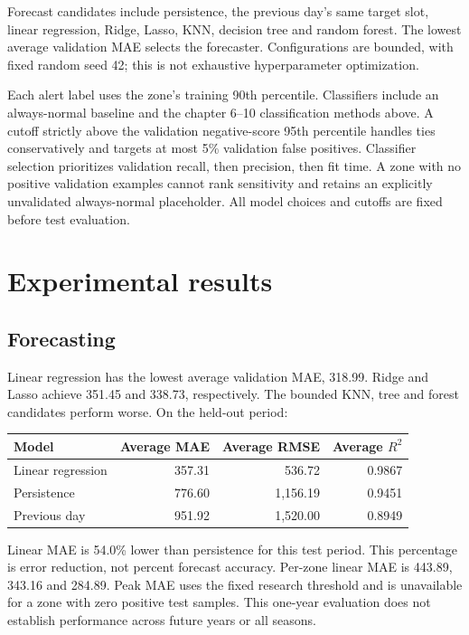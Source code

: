 \documentclass[11pt,a4paper]{article}
\begin{document}
Forecast candidates include persistence, the previous day's same target slot, linear regression, Ridge, Lasso, KNN, decision tree and random forest. The lowest average validation MAE selects the forecaster. Configurations are bounded, with fixed random seed 42; this is not exhaustive hyperparameter optimization.

Each alert label uses the zone's training 90th percentile. Classifiers include an always-normal baseline and the chapter 6--10 classification methods above. A cutoff strictly above the validation negative-score 95th percentile handles ties conservatively and targets at most 5\% validation false positives. Classifier selection prioritizes validation recall, then precision, then fit time. A zone with no positive validation examples cannot rank sensitivity and retains an explicitly unvalidated always-normal placeholder. All model choices and cutoffs are fixed before test evaluation.

\section{Experimental results}
\subsection{Forecasting}
Linear regression has the lowest average validation MAE, 318.99. Ridge and Lasso achieve 351.45 and 338.73, respectively. The bounded KNN, tree and forest candidates perform worse. On the held-out period:
\begin{center}
\begin{tabular}{lrrr}\toprule
Model & Average MAE & Average RMSE & Average $R^2$\\\midrule
Linear regression & 357.31 & 536.72 & 0.9867\\
Persistence & 776.60 & 1,156.19 & 0.9451\\
Previous day & 951.92 & 1,520.00 & 0.8949\\\bottomrule
\end{tabular}
\end{center}
Linear MAE is 54.0\% lower than persistence for this test period. This percentage is error reduction, not percent forecast accuracy. Per-zone linear MAE is 443.89, 343.16 and 284.89. Peak MAE uses the fixed research threshold and is unavailable for a zone with zero positive test samples. This one-year evaluation does not establish performance across future years or all seasons.
\end{document}

